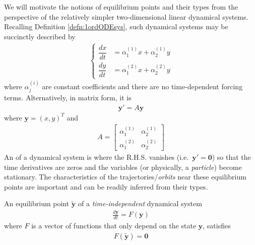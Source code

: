 We will motivate the notions of equilibrium points and their types from the perspective of the relatively simpler two-dimensional linear dynamical systems. Recalling Definition \ref{defn:1ordODEsys}, such dynamical systems may be succinctly described by
\begin{align}
\left\{\begin{alignedat}{1}
\dfrac{dx}{dt} &= \alpha_1^{(1)} x + \alpha_2^{(1)} y \\
\dfrac{dy}{dt} &= \alpha_1^{(2)} x + \alpha_2^{(2)} y   
\end{alignedat}\right.
\label{eqn:2ddynexplicit}
\end{align}
where $\alpha_j^{(i)}$ are constant coefficients and there are no time-dependent forcing terms. Alternatively, in matrix form, it is
\begin{align}
\textbf{y}' = A\textbf{y} \label{eqn:17.2}
\end{align}
where $\textbf{y} = (x,y)^T$ and
\begin{align}
A = 
\begin{bmatrix}
\alpha_1^{(1)} & \alpha_2^{(1)} \\
\alpha_1^{(2)} & \alpha_2^{(2)} 
\end{bmatrix}
\label{eqn:2ddynexplicit2}
\end{align}
An  of a dynamical system is where the R.H.S. vanishes (i.e.\ $\textbf{y}' = \textbf{0}$) so that the time derivatives are zeros and the variables (or physically, a \textit{particle}) become stationary. The characteristics of the trajectories/\textit{orbits} near these equilibrium points are important and can be readily inferred from their types.
\begin{defn}
\label{defn:eqpts}
An equilibrium point $\tilde{\textbf{y}}$ of a \textit{time-independent} dynamical system
\begin{align}
\frac{d\textbf{y}}{dt} = F(\textbf{y}) \label{eqn:eqpts1}
\end{align}
where $F$ is a vector of functions that only depend on the state $\textbf{y}$, satisfies
\begin{align}
F(\tilde{\textbf{y}}) = \textbf{0} \label{eqn:eqpts2}
\end{align}
\end{defn}
